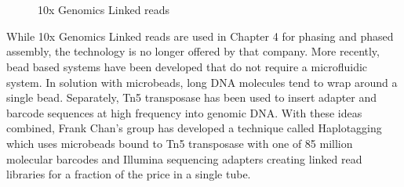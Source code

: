 \begin{figure}[htbp!]

\caption{10x Genomics Linked reads}
\label{figure:linkedreads}
\begin{centering}
 \\
 \\
\end{centering}
\end{figure}

\par{
While 10x Genomics Linked reads are used in Chapter 4 for phasing and phased assembly, the technology is no longer offered by that company. More recently, bead based systems have been developed that do not require a microfluidic system. In solution with microbeads, long DNA molecules tend to wrap around a single bead\cite{beadphasing}\cite{LFR}. Separately, Tn5 transposase has been used to insert adapter and barcode sequences at high frequency into genomic DNA\cite{cptseq}. With these ideas combined, Frank Chan's group has developed a technique called Haplotagging which uses microbeads bound to Tn5 transposase with one of 85 million molecular barcodes and Illumina sequencing adapters creating linked read libraries for a fraction of the price in a single tube\cite{haplotagging}.
}


